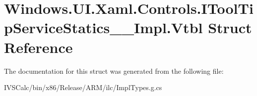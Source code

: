 \hypertarget{struct_windows_1_1_u_i_1_1_xaml_1_1_controls_1_1_i_tool_tip_service_statics_____impl_1_1_vtbl}{}\section{Windows.\+U\+I.\+Xaml.\+Controls.\+I\+Tool\+Tip\+Service\+Statics\+\_\+\+\_\+\+Impl.\+Vtbl Struct Reference}
\label{struct_windows_1_1_u_i_1_1_xaml_1_1_controls_1_1_i_tool_tip_service_statics_____impl_1_1_vtbl}


The documentation for this struct was generated from the following file\+:\begin{DoxyCompactItemize}
\item 
I\+V\+S\+Calc/bin/x86/\+Release/\+A\+R\+M/ilc/Impl\+Types.\+g.\+cs\end{DoxyCompactItemize}
